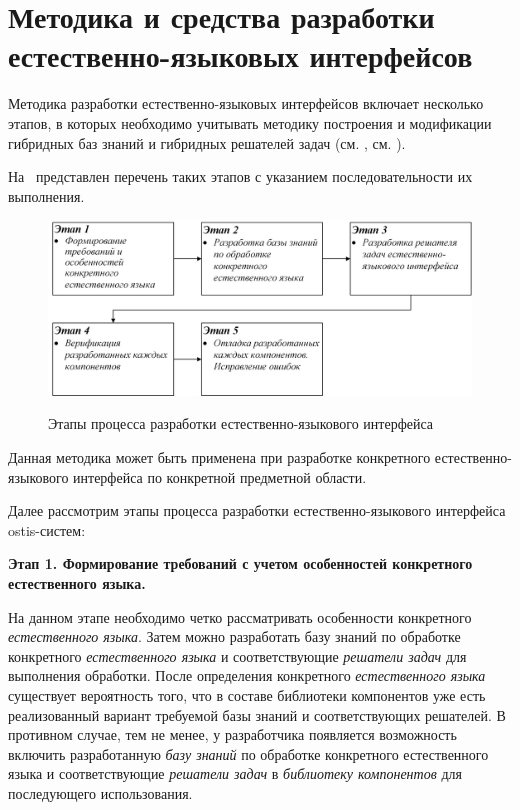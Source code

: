 \section{Методика и средства разработки естественно-языковых интерфейсов}
\label{section_natural_language_interface_development_methods}

Методика разработки естественно-языковых интерфейсов включает несколько этапов, в которых необходимо учитывать методику построения и модификации гибридных баз знаний и гибридных решателей задач (см. , см. ).

На~\textit{} представлен перечень таких этапов с указанием последовательности их выполнения.

\begin{figure}[H]
	\centering
	\caption{Этапы процесса разработки естественно-языкового интерфейса}
	\includegraphics[scale=0.8,width=1.0\textwidth]{images/part4/chapter_chinese/method}
	\label{fig:method-interface}
\end{figure}

Данная методика может быть применена при разработке конкретного естественно-языкового интерфейса по конкретной предметной области.

Далее рассмотрим этапы процесса разработки естественно-языкового интерфейса ostis-систем:

\textbf{Этап 1. Формирование требований с учетом особенностей конкретного естественного языка.}

На данном этапе необходимо четко рассматривать особенности конкретного \textit{естественного языка}.
Затем можно разработать базу знаний по обработке конкретного \textit{естественного языка} и соответствующие \textit{решатели задач} для выполнения обработки.
После определения конкретного \textit{естественного языка} существует вероятность того, что в составе библиотеки компонентов уже есть реализованный вариант требуемой базы знаний и соответствующих решателей.
В противном случае, тем не менее, у разработчика появляется возможность включить разработанную \textit{базу знаний} по обработке конкретного естественного языка и соответствующие \textit{решатели задач} в \textit{библиотеку компонентов} для последующего использования.


